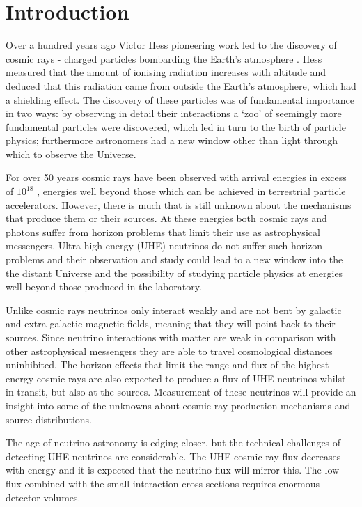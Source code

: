 \chapter{Introduction}
\label{chap:introduction}

Over a hundred years ago Victor Hess pioneering work led to the discovery of cosmic rays - charged particles bombarding the Earth's atmosphere \cite{HessNobelLectures}. Hess measured that the amount of ionising radiation increases with altitude and deduced that this radiation came from outside the Earth's atmosphere, which had a shielding effect. The discovery of these particles was of fundamental importance in two ways: by observing in detail their interactions a `zoo' of seemingly more fundamental particles were discovered, which led in turn to the birth of particle physics; furthermore astronomers had a new window other than light through which to observe the Universe.

For over 50 years cosmic rays have been observed with arrival energies in excess of $10^{18}$ \eV, energies well beyond those which can be achieved in terrestrial particle accelerators. However, there is much that is still unknown about the mechanisms that produce them or their sources. At these energies both cosmic rays and photons suffer from horizon problems that limit their use as astrophysical messengers. Ultra-high energy (UHE) neutrinos do not suffer such horizon problems and their observation and study could lead to a new window into the the distant Universe and the possibility of studying particle physics at energies well beyond those produced in the laboratory. 

Unlike cosmic rays neutrinos only interact weakly and are not bent by galactic and extra-galactic magnetic fields, meaning that they will point back to their sources. Since neutrino interactions with matter are weak in comparison with other astrophysical messengers they are able to travel cosmological distances uninhibited. The horizon effects that limit the range and flux of the highest energy cosmic rays are also expected to produce a flux of UHE neutrinos whilst in transit, but also at the sources. Measurement of these neutrinos will provide an insight into some of the unknowns about cosmic ray production mechanisms and source distributions.

The age of neutrino astronomy is edging closer, but the technical challenges of detecting UHE neutrinos are considerable. The UHE cosmic ray flux decreases with energy and it is expected that the neutrino flux will mirror this. The low flux combined with the small interaction cross-sections requires enormous detector volumes.

